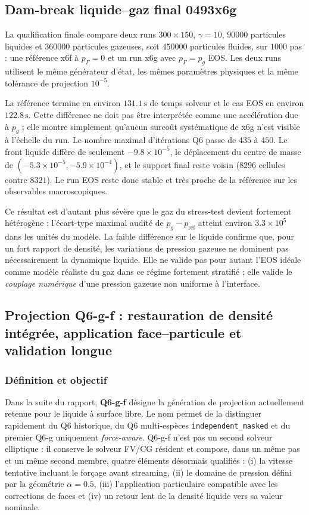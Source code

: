 \documentclass[11pt,a4paper]{article}
\begin{document}
\subsection{Dam-break liquide--gaz final 0493x6g}

La qualification finale compare deux runs $300\times150$, $\gamma=10$, $90000$ particules liquides et $360000$ particules gazeuses, soit $450000$ particules fluides, sur $1000$ pas : une référence x6f à $p_\Gamma=0$ et un run x6g avec $p_\Gamma=p_g$ EOS. Les deux runs utilisent le même générateur d'état, les mêmes paramètres physiques et la même tolérance de projection $10^{-5}$.

La référence termine en environ $131.1\,\mathrm{s}$ de temps solveur et le cas EOS en environ $122.8\,\mathrm{s}$. Cette différence ne doit pas être interprétée comme une accélération due à $p_g$ ; elle montre simplement qu'aucun surcoût systématique de x6g n'est visible à l'échelle du run. Le nombre maximal d'itérations Q6 passe de $435$ à $450$. Le front liquide diffère de seulement $-9.8\times10^{-5}$, le déplacement du centre de masse de $(-5.3\times10^{-5},-5.9\times10^{-4})$, et le support final reste voisin ($8296$ cellules contre $8321$). Le run EOS reste donc stable et très proche de la référence sur les observables macroscopiques.

Ce résultat est d'autant plus sévère que le gaz du stress-test devient fortement hétérogène : l'écart-type maximal audité de $p_g-p_{\mathrm{ref}}$ atteint environ $3.3\times10^5$ dans les unités du modèle. La faible différence sur le liquide confirme que, pour un fort rapport de densité, les variations de pression gazeuse ne dominent pas nécessairement la dynamique liquide. Elle ne valide pas pour autant l'EOS idéale comme modèle réaliste du gaz dans ce régime fortement stratifié ; elle valide le \emph{couplage numérique} d'une pression gazeuse non uniforme à l'interface.


\subsection{Projection Q6-g-f : restauration de densité intégrée, application face--particule et validation longue}
\label{subsec:q6-g-f}

\subsubsection{Définition et objectif}

Dans la suite du rapport, \textbf{Q6-g-f} désigne la génération de projection actuellement retenue pour le liquide à surface libre. Le nom permet de la distinguer rapidement du Q6 historique, du Q6 multi-espèces \texttt{independent\_masked} et du premier Q6-g uniquement \emph{force-aware}. Q6-g-f n'est pas un second solveur elliptique : il conserve le solveur FV/CG résident et compose, dans un même pas et un même second membre, quatre éléments désormais qualifiés : (i) la vitesse tentative incluant le forçage avant streaming, (ii) le domaine de pression défini par la géométrie $\alpha=0.5$, (iii) l'application particulaire compatible avec les corrections de faces et (iv) un retour lent de la densité liquide vers sa valeur nominale.
\end{document}
